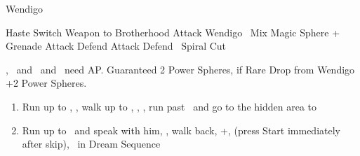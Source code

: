 \begin{battle}[18000]{Wendigo}
    \begin{itemize}
        \tidusf Haste \tidus
        \tidusf Switch Weapon to Brotherhood
        \tidusf Attack Wendigo
        \rikkuf \od\ Mix Magic Sphere + Grenade
        \tidusf Attack
        \yunaf Defend
        \tidusf Attack
        \luluf Defend
        \tidusf \od\ Spiral Cut
    \end{itemize}
    \yuna, \tidus\ and \lulu\ and \auron\ need AP.
    Guaranteed 2 Power Spheres, if Rare Drop from Wendigo +2 Power Spheres.
\end{battle}
\begin{enumerate}[resume]
    \item Run up to \rikku, \sd, walk up to \yuna, \sd, \save, run past \kimahri\ and go to the hidden area to 
    \item Run up to \auron\ and speak with him, \sd, walk back, \cs+\skippablefmv[1:00], (press Start immediately after skip), \sd\ in Dream Sequence
\end{enumerate}
\winnp
